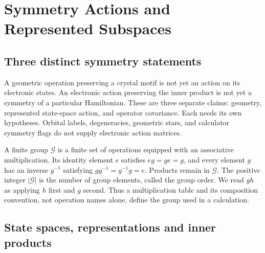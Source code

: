 \chapter{Symmetry Actions and Represented Subspaces}
\label{ch:symmetry-actions-represented-subspaces}


\section{Three distinct symmetry statements}

A geometric operation preserving a crystal motif is not yet an action on its
electronic states. An electronic action preserving the inner product is not yet
a symmetry of a particular Hamiltonian. These are three separate claims:
geometry, represented state-space action, and operator covariance. Each needs
its own hypotheses. Orbital labels, degeneracies, geometric stars, and calculator
symmetry flags do not supply electronic action matrices.

\begin{definition}
\label{def:symmetry-finite-group}
A finite group $\mathcal G$ is a finite set of operations equipped with an
associative multiplication. Its identity element $e$ satisfies $eg=ge=g$,
and every element $g$ has an inverse $g^{-1}$ satisfying
$gg^{-1}=g^{-1}g=e$. Products remain in $\mathcal G$. The positive integer
$|\mathcal G|$ is the number of group elements, called the group order.
We read $gh$ as applying $h$ first and $g$ second. Thus a multiplication table
and its composition convention, not operation names alone, define the group
used in a calculation.
\end{definition}

\section{State spaces, representations and inner products}

